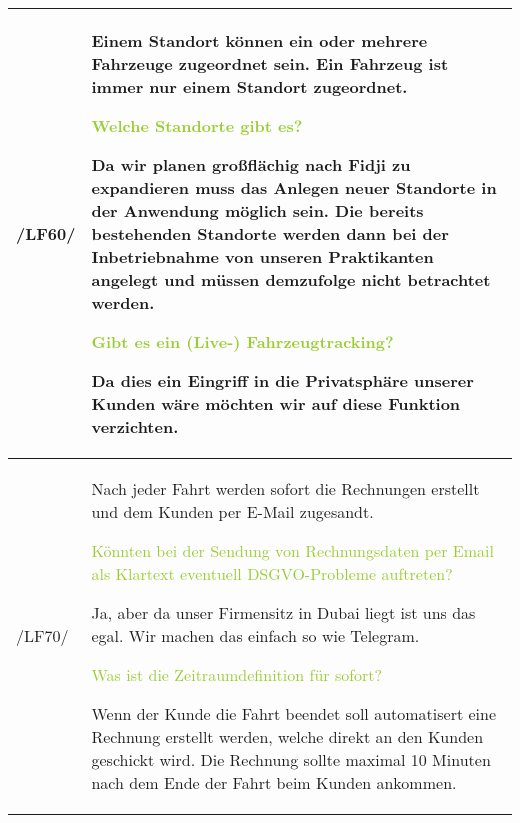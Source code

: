 \begin{tabular}[ht] {l | p{13cm}}
    \hline
    /LF60/ & Einem Standort können ein oder mehrere Fahrzeuge zugeordnet sein. Ein Fahrzeug ist immer nur einem Standort zugeordnet. 
    
    \textcolor{YellowGreen}{Welche Standorte gibt es?}

    \textcolor{NavyBlue}{Da wir planen großflächig nach Fidji zu expandieren muss das Anlegen neuer Standorte in der Anwendung möglich sein. Die bereits bestehenden Standorte werden dann bei der Inbetriebnahme von unseren Praktikanten angelegt und müssen demzufolge nicht betrachtet werden.}
    
    \textcolor{YellowGreen}{Gibt es ein (Live-) Fahrzeugtracking?}
    
    \textcolor{NavyBlue}{Da dies ein Eingriff in die Privatsphäre unserer Kunden wäre möchten wir auf diese Funktion verzichten.}
    \\
    \hline
    /LF70/ & Nach jeder Fahrt werden sofort die Rechnungen erstellt und dem Kunden per  
    E-Mail zugesandt. 

    \textcolor{YellowGreen}{Könnten bei der Sendung von Rechnungsdaten per Email als Klartext eventuell DSGVO-Probleme auftreten?}

    \textcolor{NavyBlue}{Ja, aber da unser Firmensitz in Dubai liegt ist uns das egal. Wir machen das einfach so wie Telegram.}

    \textcolor{YellowGreen}{Was ist die Zeitraumdefinition für \grqq{}sofort\grqq{}?}

    \textcolor{NavyBlue}{Wenn der Kunde die Fahrt beendet soll automatisert eine Rechnung erstellt werden, welche direkt an den Kunden geschickt wird. Die Rechnung sollte maximal 10 Minuten nach dem Ende der Fahrt beim Kunden ankommen.}
    \\
    \hline
\end{tabular}

